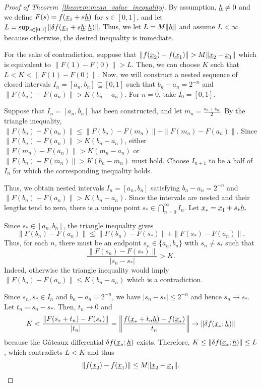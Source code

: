 \begin{proof}[Proof of Theorem~\ref{theorem:mean_value_inequality}]
By assumption, \(\underline{h}\neq 0\) and we define $F(s)=f(\underline{x}_1+s\underline{h})$ for $s\in[0,1]$,
and let $L
=
\sup_{s\in[0,1]}
\left\|
\delta f(\underline{x}_1+s\underline{h};\underline{h})
\right\|$.
Thus, we let $L=M\|\underline{h}\|$ and assume $L<\infty$ because otherwise, the desired inequality is immediate.

For the sake of contradiction, suppose that $\|f(\underline{x}_2)-f(\underline{x}_1)\| > M\|\underline{x}_2-\underline{x}_1\|$ which is equivalent to $\|F(1)-F(0)\|>L$.
Then, we can choose \(K\) such that $L<K<\|F(1)-F(0)\|$.
Now, we will construct a nested sequence of closed intervals $I_n=[a_n,b_n]\subseteq[0,1]$ such that $b_n-a_n=2^{-n}$ and $\|F(b_n)-F(a_n)\|>K(b_n-a_n)$.
For \(n=0\), take \(I_0=[0,1]\).

Suppose that \(I_n=[a_n,b_n]\) has been constructed, and let $m_n=\frac{a_n+b_n}{2}$.
By the triangle inequality, $\|F(b_n)-F(a_n)\|
\leq
\|F(b_n)-F(m_n)\|
+
\|F(m_n)-F(a_n)\|$.
Since $\|F(b_n)-F(a_n)\|>K(b_n-a_n)$,
either $\|F(m_n)-F(a_n)\|>K(m_n-a_n)$
or $\|F(b_n)-F(m_n)\|>K(b_n-m_n)$ must hold.
Choose \(I_{n+1}\) to be a half of \(I_n\) for which the
corresponding inequality holds.

Thus, we obtain nested intervals \(I_n=[a_n,b_n]\) satisfying $b_n-a_n=2^{-n}$
and $\|F(b_n)-F(a_n)\|>K(b_n-a_n)$.
Since the intervals are nested and their lengths tend to zero, there is
a unique point $s_*\in\bigcap_{n=0}^{\infty} I_n$.
Let $\underline{x}_*=\underline{x}_1+s_*\underline{h}.$

Since $s_*\in[a_n,b_n]$, the triangle inequality gives
\[
\|F(b_n)-F(a_n)\|
\leq
\|F(b_n)-F(s_*)\|+\|F(s_*)-F(a_n)\|.
\]
Thus, for each $n$, there must be an endpoint $s_n\in\{a_n,b_n\}$ with $s_n\neq s_*$ such that
\[
\frac{\|F(s_n)-F(s_*)\|}{|s_n-s_*|}>K.
\]
Indeed, otherwise the triangle inequality would imply $\|F(b_n)-F(a_n)\|\leq K(b_n-a_n)$ which is a contradiction.

Since $s_n,s_*\in I_n$ and $b_n-a_n=2^{-n}$, we have
$|s_n-s_*|\leq 2^{-n}$ and hence $s_n\to s_*$.
Let $t_n=s_n-s_*$.
Then, $t_n\to 0$ and
\[
K
<
\frac{\|F(s_*+t_n)-F(s_*)\|}{|t_n|}
=
\left\|
\frac{f(\underline{x}_*+t_n\underline{h})-f(\underline{x}_*)}{t_n}
\right\| \to
\| \delta f(\underline{x}_*;\underline{h}) \|
\]
because the G\^{a}teaux differential $\delta f(\underline{x}_*;\underline{h})$ exists. 
Therefore, $K \leq \|\delta f(\underline{x}_*;\underline{h})\|
\leq L$, which contradicts $L<K$ and thus
\[
\|f(\underline{x}_2)-f(\underline{x}_1)\|
\leq
M\|\underline{x}_2-\underline{x}_1\|. \qedhere
\]
\end{proof}
